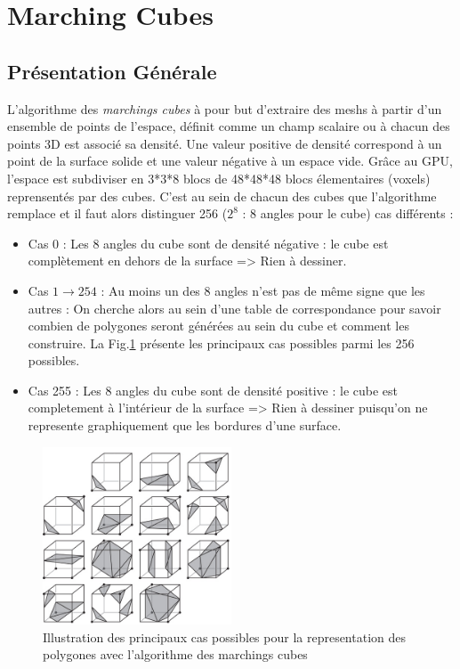 \documentclass[a4paper]{article}
\begin{document}
\section{Marching Cubes}

\subsection{Présentation Générale}

L'algorithme des \textit{marchings cubes} à pour but d'extraire des meshs à partir d'un ensemble de points de l'espace, définit comme un champ scalaire ou à chacun des points 3D est associé sa densité. Une valeur positive de densité correspond à un point de la surface solide et une valeur négative à un espace vide. Grâce au GPU, l'espace est subdiviser en 3*3*8 blocs de 48*48*48 blocs élementaires (voxels) reprensentés par des cubes. C'est au sein de chacun des cubes que l'algorithme remplace et il faut alors distinguer 256 ($2^8$ : 8 angles pour le cube) cas différents : 
\begin{itemize}
\item Cas 0 : Les 8 angles du cube sont de densité négative : le cube est complètement en dehors de la surface => Rien à dessiner.
\item Cas $ 1 \to 254$ : Au moins un des 8 angles n'est pas de même signe que les autres : On cherche alors au sein d'une table de correspondance pour savoir combien de polygones seront générées au sein du cube et comment les construire. La Fig.\ref{marchingCubes} présente les principaux cas possibles parmi les 256 possibles. 
\item Cas 255 : Les 8 angles du cube sont de densité positive : le cube est completement à l'intérieur de la surface => Rien à dessiner puisqu'on ne represente graphiquement que les bordures d'une surface. 

\end{itemize}

\begin{figure}[H]
\centering
\includegraphics[width=0.5\textwidth]{figures/marchingCubes.png}
\caption{Illustration des principaux cas possibles pour la representation des polygones avec l'algorithme des marchings cubes}
\label{marchingCubes}
\end{figure}
\end{document}
